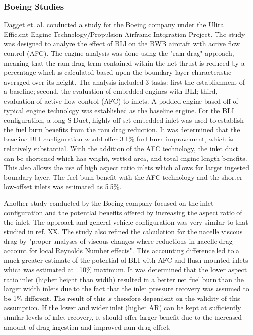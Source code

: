 \documentclass[12pt]{gatech-thesis}
\begin{document}
\subsubsection{Boeing Studies}
Dagget et. al. conducted a study for the Boeing company under the Ultra Efficient Engine Technology/Propulsion Airframe Integration Project.  The study was designed to analyze the effect of BLI on the BWB aircraft with active flow control (AFC).  The engine analysis was done using the "ram drag" approach, meaning that the ram drag term contained within the net thrust is reduced by a percentage which is calculated based upon the boundary layer characteristic averaged over its height.  The analysis included 3 tasks:  first the establishment of a baseline; second, the evaluation of embedded engines with BLI; third, evaluation of active flow control (AFC) to inlets.  A podded engine based off of typical engine technology was established as the baseline engine.  For the BLI configuration, a long S-Duct, highly off-set embedded inlet was used to establish the fuel burn benefits from the ram drag reduction.  It was determined that the baseline BLI configuration would offer 3.1\% fuel burn improvement, which is relatively substantial.  With the addition of the AFC technology, the inlet duct can be shortened which has weight, wetted area, and total engine length benefits.  This also allows the use of high aspect ratio inlets which allows for larger ingested boundary layer.  The fuel burn benefit with the AFC technology and the shorter low-offset inlets was estimated as 5.5\%.  

\indent Another study conducted by the Boeing company focused on the inlet configuration and the potential benefits offered by increasing the aspect ratio of the inlet.  The approach and general vehicle configuration was very similar to that studied in ref. XX.  The study also refined the calculation for the nacelle viscous drag by "proper analyses of viscous changes where reductions in nacelle drag account for local Reynolds Number effects".  This accounting difference led to a much greater estimate of the potential of BLI with AFC and flush mounted inlets which was estimated at ~10\% maximum.  It was determined that the lower aspect ratio inlet (higher height than width) resulted in a better net fuel burn than the larger width inlets due to the fact that the inlet pressure recovery was assumed to be 1\% different.  The result of this is therefore dependent on the validity of this assumption.  If the lower and wider inlet (higher AR) can be kept at sufficiently similar levels of inlet recovery, it should offer larger benefit due to the increased amount of drag ingestion and improved ram drag effect.
\end{document}
